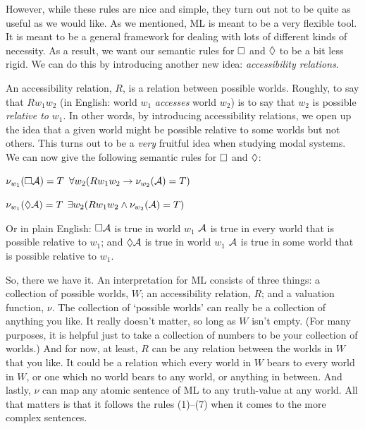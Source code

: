 However, while these rules are nice and simple, they turn out not to be quite as useful as we would like. As we mentioned, ML is meant to be a very flexible tool. It is meant to be a general framework for dealing with lots of different kinds of necessity. As a result, we want our semantic rules for $\Box$ and $\Diamond$ to be a bit less rigid. We can do this by introducing another new idea: \emph{accessibility relations}.

An accessibility relation, $R$, is a relation between possible worlds. Roughly, to say that $Rw_1w_2$ (in English: world $w_1$ \emph{accesses} world $w_2$) is to say that $w_2$ is possible \emph{relative to} $w_1$. In other words, by introducing accessibility relations, we open up the idea that a given world might be possible relative to some worlds but not others. This turns out to be a \emph{very} fruitful idea when studying modal systems. We can now give the following semantic rules for $\Box$ and $\Diamond$:
\begin{compactlist}[resume]
	\item $\nu_{w_1}(\Box \mathcal{A})=T$ \ifeff{} $\forall w_2 (Rw_1w_2\rightarrow \nu_{w_2}(\mathcal{A})=T)$
	\item $\nu_{w_1}(\Diamond \mathcal{A})=T$ \ifeff{} $\exists w_2 (Rw_1w_2\wedge \nu_{w_2}(\mathcal{A})=T)$
\end{compactlist}
Or in plain English: $\Box\mathcal{A}$ is true in world $w_1$ \ifeff{} $\mathcal{A}$ is true in every world that is possible relative to $w_1$; and $\Diamond\mathcal{A}$ is true in world $w_1$ \ifeff{} $\mathcal{A}$ is true in some world that is possible relative to $w_1$.

So, there we have it. An interpretation for ML consists of three things: a collection of possible worlds, $W$; an accessibility relation, $R$; and a valuation function, $\nu$. The collection of `possible worlds' can really be a collection of anything you like. It really doesn't matter, so long as $W$ isn't empty. (For many purposes, it is helpful just to take a collection of numbers to be your collection of worlds.) And for now, at least, $R$ can be any relation between the worlds in $W$ that you like. It could be a relation which every world in $W$ bears to every world in $W$, or one which no world bears to any world, or anything in between. And lastly, $\nu$ can map any atomic sentence of ML to any truth-value at any world. All that matters is that it follows the rules (1)--(7) when it comes to the more complex sentences.

